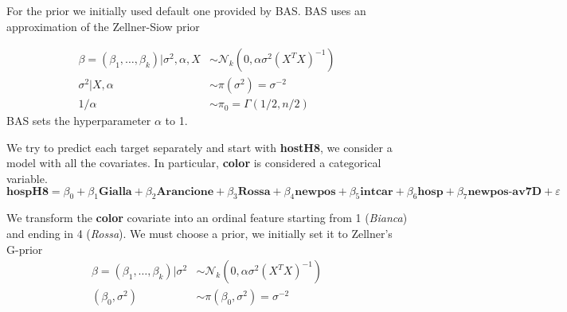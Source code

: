 \documentclass[12pt,a4paper]{article}
\theoremstyle{definition}
\theoremstyle{remark}
\begin{document}
For the prior we initially used default one provided by BAS. BAS uses an approximation of the Zellner-Siow prior 

	\begin{align*}
	\beta = (\beta_1, \dots, \beta_k)|\sigma^2, \alpha, X &\sim \mathcal{N}_k(0, \alpha\sigma^2(X^TX)^{-1}) \\
	\sigma^2|X,\alpha &\sim \pi(\sigma^2) = \sigma^{-2} \\
	1/\alpha &\sim \pi_0 = \Gamma(1/2, n/2)
\end{align*}
BAS sets the hyperparameter $\alpha$ to 1. 

We try to predict each target separately and start with \textbf{hostH8}, we consider a model with all the covariates. In particular, \textbf{color} is considered a categorical variable.
\begin{dmath*}
	\textbf{hospH8} = \beta_0 + \beta_1\textbf{Gialla} + \beta_2\textbf{Arancione} + \beta_3\textbf{Rossa} + \beta_4\textbf{newpos} + \beta_5\textbf{intcar} + \beta_6\textbf{hosp} + \beta_7\textbf{newpos-av7D} + \varepsilon
\end{dmath*}



We transform the \textbf{color} covariate into an ordinal feature starting from 1 (\textit{Bianca}) and ending in 4 (\textit{Rossa}). 
\newpage
We must choose a prior, we initially set it to Zellner's G-prior
	\begin{align*}
	\beta = (\beta_1,\dots, \beta_k)|\sigma^2 &\sim \mathcal{N}_k(0, \alpha\sigma^2(X^TX)^{-1}) \\
	(\beta_0, \sigma^2) &\sim \pi(\beta_0, \sigma^2) = \sigma^{-2}
\end{align*}
\end{document}
